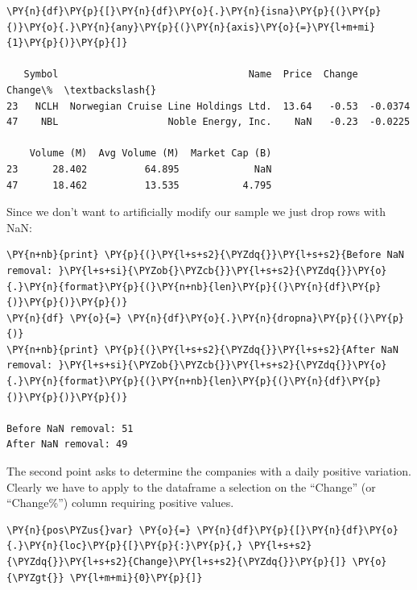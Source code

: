 \begin{Answer}
\begin{tcolorbox}[size=fbox, boxrule=1pt, colback=cellbackground, colframe=cellborder]
\begin{Verbatim}[commandchars=\\\{\}]
\PY{n}{df}\PY{p}{[}\PY{n}{df}\PY{o}{.}\PY{n}{isna}\PY{p}{(}\PY{p}{)}\PY{o}{.}\PY{n}{any}\PY{p}{(}\PY{n}{axis}\PY{o}{=}\PY{l+m+mi}{1}\PY{p}{)}\PY{p}{]}

   Symbol                                 Name  Price  Change  Change\%  \textbackslash{}
23   NCLH  Norwegian Cruise Line Holdings Ltd.  13.64   -0.53  -0.0374
47    NBL                   Noble Energy, Inc.    NaN   -0.23  -0.0225

    Volume (M)  Avg Volume (M)  Market Cap (B)
23      28.402          64.895             NaN
47      18.462          13.535           4.795
\end{Verbatim}
\end{tcolorbox}
        
Since we don't want to artificially modify our sample we just drop rows with NaN:

\begin{tcolorbox}[size=fbox, boxrule=1pt, colback=cellbackground, colframe=cellborder]
\begin{Verbatim}[commandchars=\\\{\}]
\PY{n+nb}{print} \PY{p}{(}\PY{l+s+s2}{\PYZdq{}}\PY{l+s+s2}{Before NaN removal: }\PY{l+s+si}{\PYZob{}\PYZcb{}}\PY{l+s+s2}{\PYZdq{}}\PY{o}{.}\PY{n}{format}\PY{p}{(}\PY{n+nb}{len}\PY{p}{(}\PY{n}{df}\PY{p}{)}\PY{p}{)}\PY{p}{)}
\PY{n}{df} \PY{o}{=} \PY{n}{df}\PY{o}{.}\PY{n}{dropna}\PY{p}{(}\PY{p}{)}
\PY{n+nb}{print} \PY{p}{(}\PY{l+s+s2}{\PYZdq{}}\PY{l+s+s2}{After NaN removal: }\PY{l+s+si}{\PYZob{}\PYZcb{}}\PY{l+s+s2}{\PYZdq{}}\PY{o}{.}\PY{n}{format}\PY{p}{(}\PY{n+nb}{len}\PY{p}{(}\PY{n}{df}\PY{p}{)}\PY{p}{)}\PY{p}{)}

Before NaN removal: 51
After NaN removal: 49
\end{Verbatim}
\end{tcolorbox}

\Question
The second point asks to determine the companies with a daily positive variation. Clearly we have to apply to the dataframe a selection on the ``Change'' (or ``Change\%'') column requiring positive values.

\begin{tcolorbox}[size=fbox, boxrule=1pt, colback=cellbackground, colframe=cellborder]
\begin{Verbatim}[commandchars=\\\{\}]
\PY{n}{pos\PYZus{}var} \PY{o}{=} \PY{n}{df}\PY{p}{[}\PY{n}{df}\PY{o}{.}\PY{n}{loc}\PY{p}{[}\PY{p}{:}\PY{p}{,} \PY{l+s+s2}{\PYZdq{}}\PY{l+s+s2}{Change}\PY{l+s+s2}{\PYZdq{}}\PY{p}{]} \PY{o}{\PYZgt{}} \PY{l+m+mi}{0}\PY{p}{]}


\end{Verbatim}
\end{tcolorbox}
\end{Answer}
